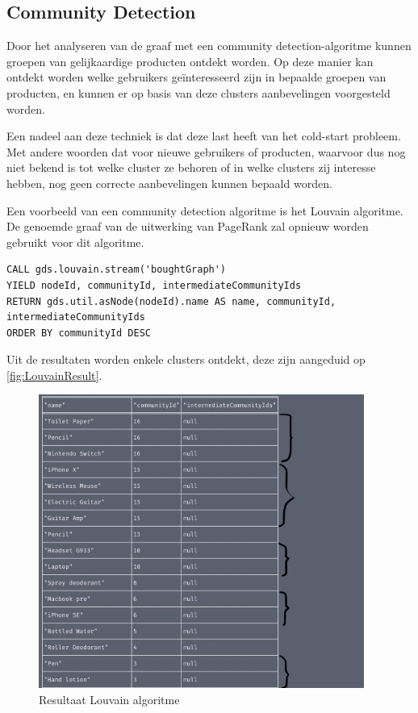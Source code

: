 \subsection{Community Detection}
\label{subsec: Community Detection}

Door het analyseren van de graaf met een community detection-algoritme kunnen groepen van gelijkaardige producten ontdekt worden. Op deze manier kan ontdekt worden welke gebruikers geïnteresseerd zijn in bepaalde groepen van producten, en kunnen er op basis van deze clusters aanbevelingen voorgesteld worden. 

Een nadeel aan deze techniek is dat deze last heeft van het cold-start probleem. Met andere woorden dat voor nieuwe gebruikers of producten, waarvoor dus nog niet bekend is tot welke cluster ze behoren of in welke clusters zij interesse hebben, nog geen correcte aanbevelingen kunnen bepaald worden.

Een voorbeeld van een community detection algoritme is het Louvain algoritme. De genoemde graaf van de uitwerking van PageRank zal opnieuw worden gebruikt voor dit algoritme.

\begin{lstlisting}[caption={ Louvain algoritme }]
CALL gds.louvain.stream('boughtGraph')
YIELD nodeId, communityId, intermediateCommunityIds
RETURN gds.util.asNode(nodeId).name AS name, communityId, intermediateCommunityIds
ORDER BY communityId DESC
\end{lstlisting}

Uit de resultaten worden enkele clusters ontdekt, deze zijn aangeduid op \autoref{fig:LouvainResult}.

\begin{figure} [ht]
	\centering
	\includegraphics[width=0.95\textwidth]{img/Louvain_result}
	\caption{Resultaat Louvain algoritme}
	\label{fig:LouvainResult}
\end{figure}



